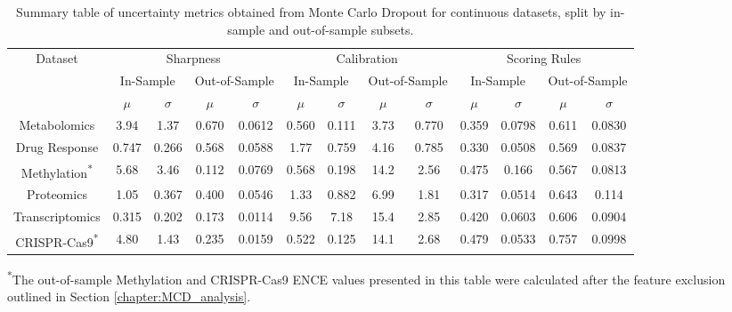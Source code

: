 \begin{landscape}
\begin{table}[p]
\centering
\begin{tabular}{|c|cccc|cccc|cccc|}
\hline
\multirow{3}{*}{Dataset} & \multicolumn{4}{c|}{Sharpness}                                              & \multicolumn{4}{c|}{Calibration}                                           & \multicolumn{4}{c|}{Scoring Rules}                                         \\ \cline{2-13}
                         & \multicolumn{2}{c|}{In-Sample}         & \multicolumn{2}{c|}{Out-of-Sample} & \multicolumn{2}{c|}{In-Sample}        & \multicolumn{2}{c|}{Out-of-Sample} & \multicolumn{2}{c|}{In-Sample}         & \multicolumn{2}{c|}{Out-of-Sample} \\ \cline{2-13}
                         & $\mu$  & \multicolumn{1}{c|}{$\sigma$} & $\mu$           & $\sigma$         & $\mu$ & \multicolumn{1}{c|}{$\sigma$} & $\mu$          & $\sigma$          & $\mu$  & \multicolumn{1}{c|}{$\sigma$} & $\mu$          & $\sigma$         \\ \hline
Metabolomics             & 3.94 & \multicolumn{1}{c|}{1.37} & 0.670 & 0.0612 & 0.560 & \multicolumn{1}{c|}{0.111} & 3.73 & 0.770 & 0.359 & \multicolumn{1}{c|}{0.0798} & 0.611 & 0.0830 \\
Drug Response            & 0.747 & \multicolumn{1}{c|}{0.266} & 0.568 & 0.0588 & 1.77 & \multicolumn{1}{c|}{0.759} & 4.16 & 0.785 & 0.330 & \multicolumn{1}{c|}{0.0508} & 0.569 & 0.0837 \\
Methylation\textsuperscript{*}              & 5.68 & \multicolumn{1}{c|}{3.46} & 0.112 & 0.0769 & 0.568 & \multicolumn{1}{c|}{0.198} & 14.2 & 2.56 & 0.475 & \multicolumn{1}{c|}{0.166} & 0.567 & 0.0813 \\
Proteomics               & 1.05 & \multicolumn{1}{c|}{0.367} & 0.400 & 0.0546 & 1.33 & \multicolumn{1}{c|}{0.882} & 6.99 & 1.81 & 0.317 & \multicolumn{1}{c|}{0.0514} & 0.643 & 0.114 \\
Transcriptomics          & 0.315 & \multicolumn{1}{c|}{0.202} & 0.173 & 0.0114 & 9.56 & \multicolumn{1}{c|}{7.18} & 15.4 & 2.85 & 0.420 & \multicolumn{1}{c|}{0.0603} & 0.606 & 0.0904 \\
CRISPR-Cas9\textsuperscript{*}              & 4.80 & \multicolumn{1}{c|}{1.43} & 0.235 & 0.0159 & 0.522 & \multicolumn{1}{c|}{0.125} & 14.1 & 2.68 & 0.479 & \multicolumn{1}{c|}{0.0533} & 0.757 & 0.0998 \\ \hline
\end{tabular}
\begin{center}
\footnotesize \textsuperscript{*}The out-of-sample Methylation and CRISPR-Cas9 ENCE values presented in this table were calculated after the feature exclusion outlined in Section \ref{chapter:MCD_analysis}.
\end{center}
\caption{Summary table of uncertainty metrics obtained from Monte Carlo Dropout for continuous datasets, split by in-sample and out-of-sample subsets.}
\label{tab:uncertainty_summary_all_metrics_sideways_MCD}
\end{table}
\end{landscape}

